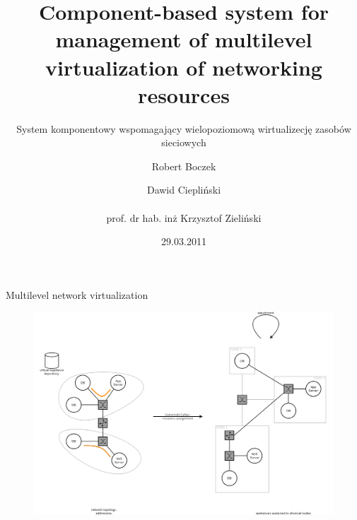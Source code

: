 \documentclass{beamer}
\title{Component-based system for management of multilevel virtualization of networking resources}
\subtitle{System komponentowy wspomagający wielopoziomową wirtualizecję zasobów sieciowych}
\author{Robert Boczek \and Dawid Ciepliński \\ ~ \\ prof. dr hab. inż Krzysztof Zieliński}
\date{29.03.2011}
\begin{document}
\begin{frame}

	\titlepage

\end{frame}

\begin{frame}{Multilevel network virtualization}
		
	\begin{figure}[H]
		\includegraphics[width=\textwidth]{img/scope.png}
	\end{figure}

\end{frame}

\end{document}
